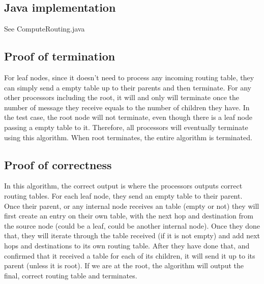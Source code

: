 \documentclass[12pt,letterpaper]{article}
\begin{document}
\subsection* {Java implementation}
See ComputeRouting.java
\subsection* {Proof of termination}
For leaf nodes, since it doesn't need to process any incoming routing table, they can simply send a empty table up to their parents and then terminate. For any other processors including the root, it will and only will terminate once the number of message they receive equals to the number of children they have. In the test case, the root node will not terminate, even though there is a leaf node passing a empty table to it. Therefore, all processors will eventually terminate using this algorithm. When root terminates, the entire algorithm is terminated. 
\subsection* {Proof of correctness}
In this algorithm, the correct output is where the processors outputs correct routing tables. For each leaf node, they send an empty table to their parent. Once their parent, or any internal node receives an table (empty or not) they will first create an entry on their own table, with the next hop and destination from the source node (could be a leaf, could be another internal node). Once they done that, they will iterate through the table received (if it is not empty) and add next hops and destinations to its own routing table. After they have done that, and confirmed that it received a table for each of its children, it will send it up to its parent (unless it is root). If we are at the root, the algorithm will output the final, correct routing table and terminates.
\end{document}
